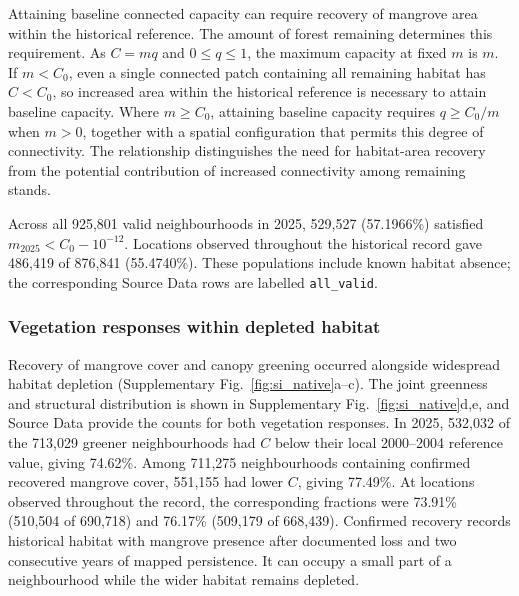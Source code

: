 Attaining baseline connected capacity can require recovery of mangrove area within the historical reference. The amount of forest remaining determines this requirement. As $C=mq$ and $0\leq q\leq1$, the maximum capacity at fixed $m$ is $m$. If $m<C_0$, even a single connected patch containing all remaining habitat has $C<C_0$, so increased area within the historical reference is necessary to attain baseline capacity. Where $m\geq C_0$, attaining baseline capacity requires $q\geq C_0/m$ when $m>0$, together with a spatial configuration that permits this degree of connectivity. The relationship distinguishes the need for habitat-area recovery from the potential contribution of increased connectivity among remaining stands.

Across all 925,801 valid neighbourhoods in 2025, 529,527 (57.1966\%) satisfied $m_{2025}<C_0-10^{-12}$. Locations observed throughout the historical record gave 486,419 of 876,841 (55.4740\%). These populations include known habitat absence; the corresponding Source Data rows are labelled \texttt{all\_valid}.

\subsubsection{Vegetation responses within depleted habitat}

Recovery of mangrove cover and canopy greening occurred alongside widespread habitat depletion (Supplementary Fig.~\ref{fig:si_native}a--c). The joint greenness and structural distribution is shown in Supplementary Fig.~\ref{fig:si_native}d,e, and Source Data provide the counts for both vegetation responses. In 2025, 532,032 of the 713,029 greener neighbourhoods had $C$ below their local 2000--2004 reference value, giving 74.62\%. Among 711,275 neighbourhoods containing confirmed recovered mangrove cover, 551,155 had lower $C$, giving 77.49\%. At locations observed throughout the record, the corresponding fractions were 73.91\% (510,504 of 690,718) and 76.17\% (509,179 of 668,439). Confirmed recovery records historical habitat with mangrove presence after documented loss and two consecutive years of mapped persistence. It can occupy a small part of a neighbourhood while the wider habitat remains depleted.

